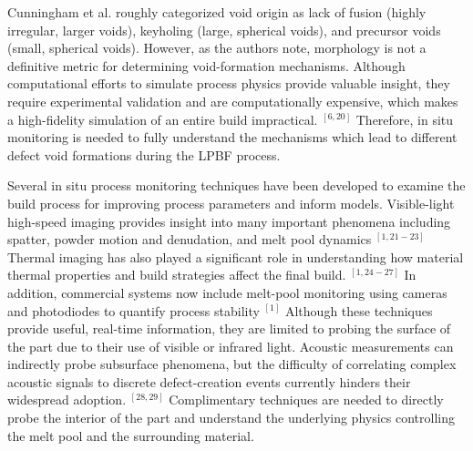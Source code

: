\documentclass[10pt]{article}
\begin{document}
Cunningham et al. roughly categorized void origin as lack of fusion (highly irregular, larger voids), keyholing (large, spherical voids), and precursor voids (small, spherical voids). However, as the authors note, morphology is not a definitive metric for determining void-formation mechanisms. Although computational efforts to simulate process physics provide valuable insight, they require experimental validation and are computationally expensive, which makes a high-fidelity simulation of an entire build impractical. ${ }^{[6,20]}$ Therefore, in situ monitoring is needed to fully understand the mechanisms which lead to different defect void formations during the LPBF process.

Several in situ process monitoring techniques have been developed to examine the build process for improving process parameters and inform models. Visible-light high-speed imaging provides insight into many important phenomena including spatter, powder motion and denudation, and melt pool dynamics $^{[1,21-23]}$ Thermal imaging has also played a significant role in understanding how material thermal properties and build strategies affect the final build. ${ }^{[1,24-27]}$ In addition, commercial systems now include melt-pool monitoring using cameras and photodiodes to quantify process stability ${ }^{[1]}$ Although these techniques provide useful, real-time information, they are limited to probing the surface of the part due to their use of visible or infrared light. Acoustic measurements can indirectly probe subsurface phenomena, but the difficulty of correlating complex acoustic signals to discrete defect-creation events currently hinders their widespread adoption. ${ }^{[28,29]}$ Complimentary techniques are needed to directly probe the interior of the part and understand the underlying physics controlling the melt pool and the surrounding material.
\end{document}

